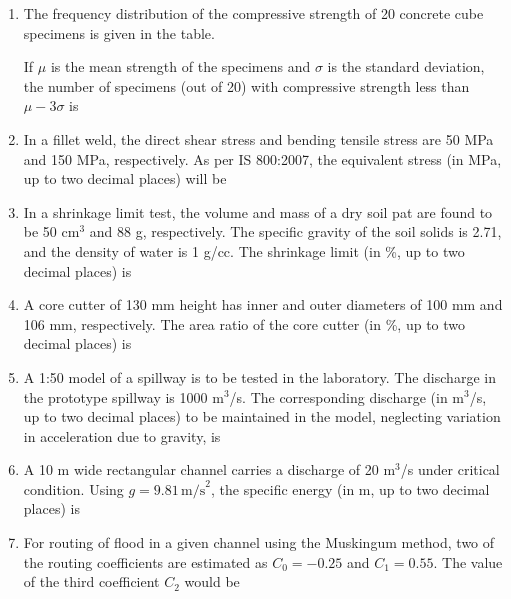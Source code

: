 \documentclass[journal,12pt,onecolumn]{IEEEtran}
\theoremstyle{remark}
\begin{document}
\begin{enumerate}
\item The frequency distribution of the compressive strength of 20 concrete cube specimens is given in the table.
  \begin{table}[H]
        \centering
    \end{table}
       
    If $\mu$ is the mean strength of the specimens and $\sigma$ is the standard deviation, the number of specimens (out of 20) with compressive strength less than $\mu - 3\sigma$ is \underline{\hspace{1cm}}

\item In a fillet weld, the direct shear stress and bending tensile stress are 50 MPa and 150 MPa, respectively. As per IS 800:2007, the equivalent stress (in MPa, up to two decimal places) will be \underline{\hspace{1cm}}

\item In a shrinkage limit test, the volume and mass of a dry soil pat are found to be 50 cm$^3$ and 88 g, respectively. The specific gravity of the soil solids is 2.71, and the density of water is 1 g/cc. The shrinkage limit (in \%, up to two decimal places) is \underline{\hspace{1cm}}

\item A core cutter of 130 mm height has inner and outer diameters of 100 mm and 106 mm, respectively. The area ratio of the core cutter (in \%, up to two decimal places) is \underline{\hspace{1cm}}

\item A 1:50 model of a spillway is to be tested in the laboratory. The discharge in the prototype spillway is 1000 m$^3$/s. The corresponding discharge (in m$^3$/s, up to two decimal places) to be maintained in the model, neglecting variation in acceleration due to gravity, is \underline{\hspace{1cm}}

\item A 10 m wide rectangular channel carries a discharge of 20 m$^3$/s under critical condition. Using $g = 9.81 \, \text{m/s}^2$, the specific energy (in m, up to two decimal places) is \underline{\hspace{1cm}}

\item For routing of flood in a given channel using the Muskingum method, two of the routing coefficients are estimated as $C_0 = -0.25$ and $C_1 = 0.55$. The value of the third coefficient $C_2$ would be \underline{\hspace{1cm}}


\end{enumerate}
\end{document}
